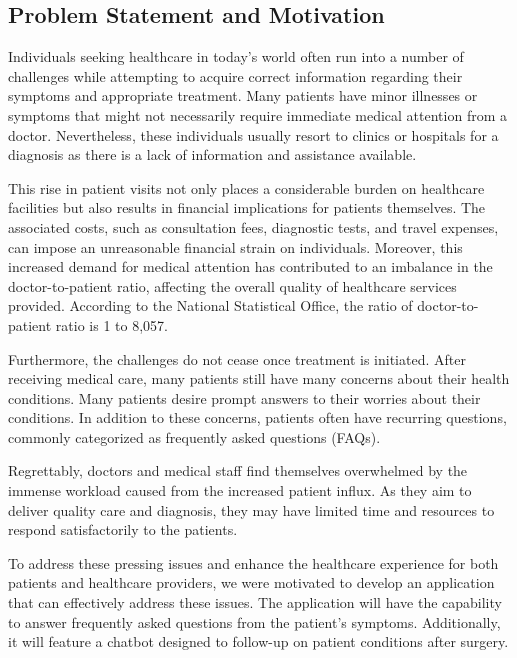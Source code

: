 \documentclass[12pt,oneside,openright,a4paper]{cpe-english-project}
\begin{document}
    \subsection{Problem Statement and Motivation}
      \qquad Individuals seeking healthcare in today's world often run into a number of challenges while attempting to acquire correct information regarding their symptoms and appropriate treatment. Many patients have minor illnesses or symptoms that might not necessarily require immediate medical attention from a doctor. Nevertheless, these individuals usually resort to clinics or hospitals for a diagnosis as there is a lack of information and assistance available. \par
      \qquad This rise in patient visits not only places a considerable burden on healthcare facilities but also results in financial implications for patients themselves. The associated costs, such as consultation fees, diagnostic tests, and travel expenses, can impose an unreasonable financial strain on individuals. Moreover, this increased demand for medical attention has contributed to an imbalance in the doctor-to-patient ratio, affecting the overall quality of healthcare services provided. According to the National Statistical Office, the ratio of doctor-to-patient ratio is 1 to 8,057\cite{NSODashboard}.\par
      \qquad Furthermore, the challenges do not cease once treatment is initiated. After receiving medical care, many patients still have many concerns about their health conditions. Many patients desire prompt answers to their worries about their conditions. In addition to these concerns, patients often have recurring questions, commonly categorized as frequently asked questions (FAQs).\par
      \qquad Regrettably, doctors and medical staff find themselves overwhelmed by the immense workload caused from the increased patient influx. As they aim to deliver quality care and diagnosis, they may have limited time and resources to respond satisfactorily to the patients.\par
      \qquad To address these pressing issues and enhance the healthcare experience for both patients and healthcare providers, we were motivated to develop an application that can effectively address these issues. The application will have the capability to answer frequently asked questions from the patient's symptoms. Additionally, it will feature a chatbot designed to follow-up on patient conditions after surgery.\par
\end{document}
